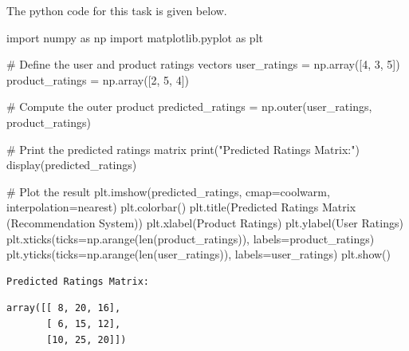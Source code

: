 \documentclass[
  letterpaper,
  DIV=11,
  numbers=noendperiod]{scrreprt}
\newenvironment{Shaded}{\begin{snugshade}}{\end{snugshade}}
\newcommand{\BuiltInTok}[1]{\textcolor[rgb]{0.00,0.23,0.31}{#1}}
\newcommand{\CommentTok}[1]{\textcolor[rgb]{0.37,0.37,0.37}{#1}}
\newcommand{\DecValTok}[1]{\textcolor[rgb]{0.68,0.00,0.00}{#1}}
\newcommand{\ImportTok}[1]{\textcolor[rgb]{0.00,0.46,0.62}{#1}}
\newcommand{\NormalTok}[1]{\textcolor[rgb]{0.00,0.23,0.31}{#1}}
\newcommand{\OperatorTok}[1]{\textcolor[rgb]{0.37,0.37,0.37}{#1}}
\newcommand{\StringTok}[1]{\textcolor[rgb]{0.13,0.47,0.30}{#1}}
\theoremstyle{plain}
\theoremstyle{definition}
\theoremstyle{remark}
\begin{document}
The python code for this task is given below.

\begin{Shaded}
\begin{Highlighting}[]
\ImportTok{import}\NormalTok{ numpy }\ImportTok{as}\NormalTok{ np}
\ImportTok{import}\NormalTok{ matplotlib.pyplot }\ImportTok{as}\NormalTok{ plt}

\CommentTok{\# Define the user and product ratings vectors}
\NormalTok{user\_ratings }\OperatorTok{=}\NormalTok{ np.array([}\DecValTok{4}\NormalTok{, }\DecValTok{3}\NormalTok{, }\DecValTok{5}\NormalTok{])}
\NormalTok{product\_ratings }\OperatorTok{=}\NormalTok{ np.array([}\DecValTok{2}\NormalTok{, }\DecValTok{5}\NormalTok{, }\DecValTok{4}\NormalTok{])}

\CommentTok{\# Compute the outer product}
\NormalTok{predicted\_ratings }\OperatorTok{=}\NormalTok{ np.outer(user\_ratings, product\_ratings)}

\CommentTok{\# Print the predicted ratings matrix}
\BuiltInTok{print}\NormalTok{(}\StringTok{"Predicted Ratings Matrix:"}\NormalTok{)}
\NormalTok{display(predicted\_ratings)}

\CommentTok{\# Plot the result}
\NormalTok{plt.imshow(predicted\_ratings, cmap}\OperatorTok{=}\StringTok{\textquotesingle{}coolwarm\textquotesingle{}}\NormalTok{, interpolation}\OperatorTok{=}\StringTok{\textquotesingle{}nearest\textquotesingle{}}\NormalTok{)}
\NormalTok{plt.colorbar()}
\NormalTok{plt.title(}\StringTok{\textquotesingle{}Predicted Ratings Matrix (Recommendation System)\textquotesingle{}}\NormalTok{)}
\NormalTok{plt.xlabel(}\StringTok{\textquotesingle{}Product Ratings\textquotesingle{}}\NormalTok{)}
\NormalTok{plt.ylabel(}\StringTok{\textquotesingle{}User Ratings\textquotesingle{}}\NormalTok{)}
\NormalTok{plt.xticks(ticks}\OperatorTok{=}\NormalTok{np.arange(}\BuiltInTok{len}\NormalTok{(product\_ratings)), labels}\OperatorTok{=}\NormalTok{product\_ratings)}
\NormalTok{plt.yticks(ticks}\OperatorTok{=}\NormalTok{np.arange(}\BuiltInTok{len}\NormalTok{(user\_ratings)), labels}\OperatorTok{=}\NormalTok{user\_ratings)}
\NormalTok{plt.show()}
\end{Highlighting}
\end{Shaded}

\begin{verbatim}
Predicted Ratings Matrix:
\end{verbatim}

\begin{verbatim}
array([[ 8, 20, 16],
       [ 6, 15, 12],
       [10, 25, 20]])
\end{verbatim}
\end{document}
